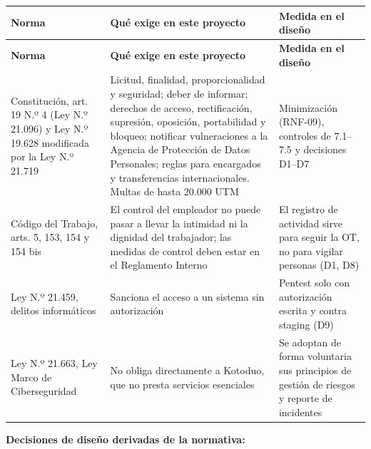 \documentclass[11pt,a4paper]{article}
\begin{document}
\begingroup
\begin{longtable}{@{}>{\raggedright\arraybackslash\hspace{0pt}}p{}>{\raggedright\arraybackslash\hspace{0pt}}p{}>{\raggedright\arraybackslash\hspace{0pt}}p{}@{}}
\toprule
\textbf{Norma} & \textbf{Qué exige en este proyecto} & \textbf{Medida en el diseño} \\ \midrule
\endfirsthead
\toprule
\textbf{Norma} & \textbf{Qué exige en este proyecto} & \textbf{Medida en el diseño} \\ \midrule
\endhead
\bottomrule
\endlastfoot
Constitución, art. 19 N.º 4 (Ley N.º 21.096) y Ley N.º 19.628 modificada por la Ley N.º 21.719 & Licitud, finalidad, proporcionalidad y seguridad; deber de informar; derechos de acceso, rectificación, supresión, oposición, portabilidad y bloqueo; notificar vulneraciones a la Agencia de Protección de Datos Personales; reglas para encargados y transferencias internacionales. Multas de hasta 20.000 UTM & Minimización (\mbox{RNF-09}), controles de 7.1--7.5 y decisiones D1--D7 \\ \addlinespace[0.25em]
Código del Trabajo, arts. 5, 153, 154 y 154 bis & El control del empleador no puede pasar a llevar la intimidad ni la dignidad del trabajador; las medidas de control deben estar en el Reglamento Interno & El registro de actividad sirve para seguir la OT, no para vigilar personas (D1, D8) \\ \addlinespace[0.25em]
Ley N.º 21.459, delitos informáticos & Sanciona el acceso a un sistema sin autorización & Pentest solo con autorización escrita y contra staging (D9) \\ \addlinespace[0.25em]
Ley N.º 21.663, Ley Marco de Ciberseguridad & No obliga directamente a Kotoduo, que no presta servicios esenciales & Se adoptan de forma voluntaria sus principios de gestión de riesgos y reporte de incidentes \\
\end{longtable}
\endgroup

\textbf{Decisiones de diseño derivadas de la normativa:}
\end{document}
